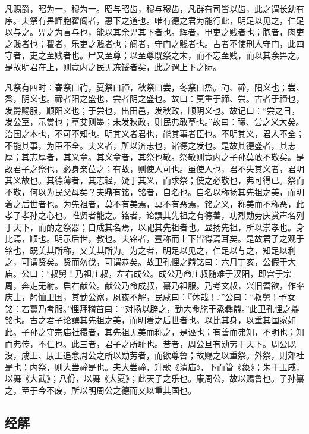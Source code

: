 \documentclass[]{article}
\begin{document}
凡赐爵，昭为一，穆为一。昭与昭齿，穆与穆齿，凡群有司皆以齿，此之谓长幼有序。夫祭有畀辉胞翟阍者，惠下之道也。唯有德之君为能行此，明足以见之，仁足以与之。畀之为言与也，能以其余畀其下者也。辉者，甲吏之贱者也；胞者，肉吏之贱者也；翟者，乐吏之贱者也；阍者，守门之贱者也。古者不使刑人守门，此四守者，吏之至贱者也。尸又至尊；以至尊既祭之末，而不忘至贱，而以其余畀之。是故明君在上，则竟内之民无冻馁者矣，此之谓上下之际。

凡祭有四时：春祭曰礿，夏祭曰禘，秋祭曰尝，冬祭曰烝。礿、禘，阳义也；尝、烝，阴义也。禘者阳之盛也，尝者阴之盛也。故曰：莫重于禘、尝。古者于禘也，发爵赐服，顺阳义也；于尝也，出田邑，发秋政，顺阴义也。故记曰：``尝之日，发公室，示赏也；草艾则墨；未发秋政，则民弗敢草也。''故曰：禘、尝之义大矣。治国之本也，不可不知也。明其义者君也，能其事者臣也。不明其义，君人不全；不能其事，为臣不全。夫义者，所以济志也，诸德之发也。是故其德盛者，其志厚；其志厚者，其义章。其义章者，其祭也敬。祭敬则竟内之子孙莫敢不敬矣。是故君子之祭也，必身亲莅之；有故，则使人可也。虽使人也，君不失其义者，君明其义故也。其德薄者，其志轻，疑于其义，而求祭；使之必敬也，弗可得已。祭而不敬，何以为民父母矣？夫鼎有铭，铭者，自名也。自名以称扬其先祖之美，而明着之后世者也。为先祖者，莫不有美焉，莫不有恶焉，铭之义，称美而不称恶，此孝子孝孙之心也。唯贤者能之。铭者，论譔其先祖之有德善，功烈勋劳庆赏声名列于天下，而酌之祭器；自成其名焉，以祀其先祖者也。显扬先祖，所以崇孝也。身比焉，顺也。明示后世，教也。夫铭者，壹称而上下皆得焉耳矣。是故君子之观于铭也，既美其所称，又美其所为。为之者，明足以见之，仁足以与之，知足以利之，可谓贤矣。贤而勿伐，可谓恭矣。故卫孔悝之鼎铭曰：六月丁亥，公假于大庙。公曰：``叔舅！乃祖庄叔，左右成公。成公乃命庄叔随难于汉阳，即宫于宗周，奔走无射。启右献公。献公乃命成叔，纂乃祖服。乃考文叔，兴旧耆欲，作率庆士，躬恤卫国，其勤公家，夙夜不解，民咸曰：『休哉！』''公曰：``叔舅！予女铭：若纂乃考服。''悝拜稽首曰：``对扬以辟之，勤大命施于烝彝鼎。''此卫孔悝之鼎铭也。古之君子论譔其先祖之美，而明着之后世者也。以比其身，以重其国家如此。子孙之守宗庙社稷者，其先祖无美而称之，是诬也；有善而弗知，不明也；知而弗传，不仁也。此三者，君子之所耻也。昔者，周公旦有勋劳于天下。周公既没，成王、康王追念周公之所以勋劳者，而欲尊鲁；故赐之以重祭。外祭，则郊社是也；内祭，则大尝禘是也。夫大尝禘，升歌《清庙》，下而管《象》；朱干玉戚，以舞《大武》；八佾，以舞《大夏》；此天子之乐也。康周公，故以赐鲁也。子孙纂之，至于今不废，所以明周公之德而又以重其国也。

\hypertarget{header-n661}{%
\subsection{经解}\label{header-n661}}
\end{document}
